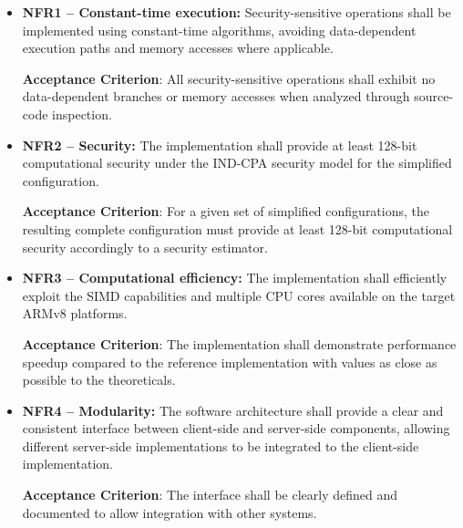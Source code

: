 \begin{itemize}
\item \textbf{NFR1 -- Constant-time execution:} Security-sensitive operations shall be implemented using constant-time algorithms, avoiding data-dependent execution paths and memory accesses where applicable.

    \textbf{Acceptance Criterion}: All security-sensitive operations shall exhibit no data-dependent branches or memory accesses when analyzed through source-code inspection.

\item \textbf{NFR2 -- Security:} The implementation shall provide at least 128-bit computational security under the IND-CPA security model for the simplified configuration.

    \textbf{Acceptance Criterion}: For a given set of simplified configurations, the resulting complete configuration must provide at least 128-bit computational security accordingly to a security estimator.

\item \textbf{NFR3 -- Computational efficiency:} The implementation shall efficiently exploit the SIMD capabilities and multiple CPU cores available on the target ARMv8 platforms.

    \textbf{Acceptance Criterion}: The implementation shall demonstrate performance speedup compared to the reference implementation with values as close as possible to the theoreticals.

\item \textbf{NFR4 -- Modularity:} The software architecture shall provide a clear and consistent interface between client-side and server-side components, allowing different server-side implementations to be integrated to the client-side implementation.

    \textbf{Acceptance Criterion}: The interface shall be clearly defined and documented to allow integration with other systems.

\end{itemize}
